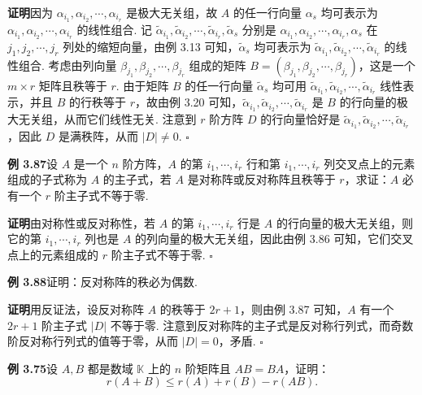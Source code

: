 \documentclass[UTF8, 12pt, fontset=fandol, oneside]{ctexart}
\begin{document}
\noindent\textbf{证明}\quad 因为 $\alpha_{i_1},\alpha_{i_2},\cdots,\alpha_{i_r}$ 是极大无关组，故 $A$ 的任一行向量 $\alpha_s$ 均可表示为 $\alpha_{i_1},\alpha_{i_2},\cdots,\alpha_{i_r}$ 的线性组合. 记 $\widetilde{\alpha}_{i_1},\widetilde{\alpha}_{i_2},\cdots,\widetilde{\alpha}_{i_r},\widetilde{\alpha}_s$ 分别是 $\alpha_{i_1},\alpha_{i_2},\cdots,\alpha_{i_r},\alpha_s$ 在 $j_1,j_2,\cdots,j_r$ 列处的缩短向量，由例 3.13 可知，$\widetilde{\alpha}_s$ 均可表示为 $\widetilde{\alpha}_{i_1},\widetilde{\alpha}_{i_2},\cdots,\widetilde{\alpha}_{i_r}$ 的线性组合. 考虑由列向量 $\beta_{j_1},\beta_{j_2},\cdots,\beta_{j_r}$ 组成的矩阵 $B=(\beta_{j_1},\beta_{j_2},\cdots,\beta_{j_r})$，这是一个 $m\times r$ 矩阵且秩等于 $r$. 由于矩阵 $B$ 的任一行向量 $\widetilde{\alpha}_s$ 均可用 $\widetilde{\alpha}_{i_1},\widetilde{\alpha}_{i_2},\cdots,\widetilde{\alpha}_{i_r}$ 线性表示，并且 $B$ 的行秩等于 $r$，故由例 3.20 可知，$\widetilde{\alpha}_{i_1},\widetilde{\alpha}_{i_2},\cdots,\widetilde{\alpha}_{i_r}$ 是 $B$ 的行向量的极大无关组，从而它们线性无关. 注意到 $r$ 阶方阵 $D$ 的行向量恰好是 $\widetilde{\alpha}_{i_1},\widetilde{\alpha}_{i_2},\cdots,\widetilde{\alpha}_{i_r}$，因此 $D$ 是满秩阵，从而 $|D|\ne 0$. $\square$

\noindent\textbf{例 3.87}\quad 设 $A$ 是一个 $n$ 阶方阵，$A$ 的第 $i_1,\cdots,i_r$ 行和第 $i_1,\cdots,i_r$ 列交叉点上的元素组成的子式称为 $A$ 的主子式，若 $A$ 是对称阵或反对称阵且秩等于 $r$，求证：$A$ 必有一个 $r$ 阶主子式不等于零.

\noindent\textbf{证明}\quad 由对称性或反对称性，若 $A$ 的第 $i_1,\cdots,i_r$ 行是 $A$ 的行向量的极大无关组，则它的第 $i_1,\cdots,i_r$ 列也是 $A$ 的列向量的极大无关组，因此由例 3.86 可知，它们交叉点上的元素组成的 $r$ 阶主子式不等于零. $\square$

\noindent\textbf{例 3.88}\quad 证明：反对称阵的秩必为偶数.

\noindent\textbf{证明}\quad 用反证法，设反对称阵 $A$ 的秩等于 $2r+1$，则由例 3.87 可知，$A$ 有一个 $2r+1$ 阶主子式 $|D|$ 不等于零. 注意到反对称阵的主子式是反对称行列式，而奇数阶反对称行列式的值等于零，从而 $|D|=0$，矛盾. $\square$

\noindent\textbf{例 3.75}\quad 设 $A,B$ 都是数域 $\mathbb{K}$ 上的 $n$ 阶矩阵且 $AB=BA$，证明：
\[
r(A+B)\le r(A)+r(B)-r(AB).
\]
\end{document}
